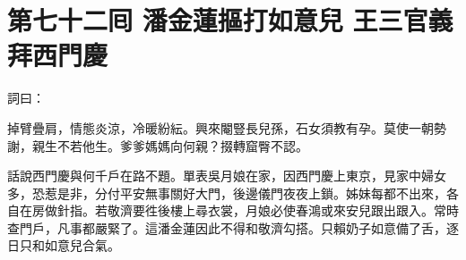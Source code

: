 
\chapter*{第七十二囘 潘金蓮摳打如意兒 王三官義拜西門慶}


詞曰：

\begin{myquote}
掉臂疊肩，情態炎涼，冷暖紛紜。興來閹豎長兒孫，石女須教有孕。莫使一朝勢謝，親生不若他生。爹爹媽媽向何親？掇轉窟臀不認。

\end{myquote}

話說西門慶與何千戶在路不題。單表吳月娘在家，因西門慶上東京，見家中婦女多，恐惹是非，分付平安無事關好大門，後邊儀門夜夜上鎖。姊妹每都不出來，各自在房做針指。若敬濟要徃後樓上尋衣裳，月娘必使春鴻或來安兒跟出跟入。常時查門戶，凡事都嚴緊了。這潘金蓮因此不得和敬濟勾搭。只賴奶子如意備了舌，逐日只和如意兒合氣。

